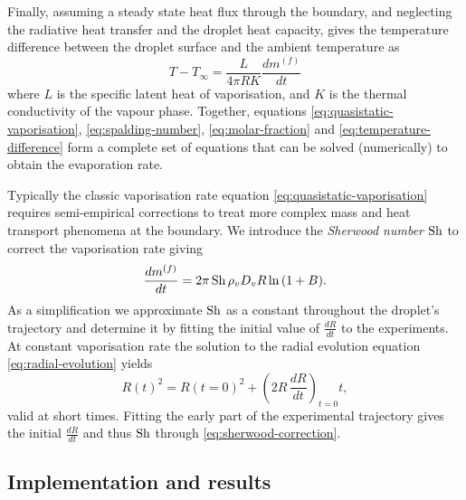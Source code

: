 \documentclass[11pt,twoside]{report}
\begin{document}
Finally, assuming a steady state heat flux through the boundary, and neglecting the radiative heat transfer and the droplet heat capacity, gives the temperature difference between the droplet surface and the ambient temperature as \cite{KulmalaJAS1992,RovelliJPCA2016}
\begin{equation}\label{eq:temperature-difference}
  T - T_\infty = \frac{L}{4\pi R K} \frac{dm^{(f)}}{dt}
\end{equation}
where $L$ is the specific latent heat of vaporisation, and $K$ is the thermal conductivity of the vapour phase.
Together, equations \eqref{eq:quasistatic-vaporisation}, \eqref{eq:spalding-number}, \eqref{eq:molar-fraction} and \eqref{eq:temperature-difference} form a complete set of equations that can be solved (numerically) to obtain the evaporation rate.

Typically the classic vaporisation rate equation \eqref{eq:quasistatic-vaporisation} requires semi-empirical corrections to treat more complex mass and heat transport phenomena at the boundary.
We introduce the \emph{Sherwood number} $\mathrm{Sh}$ to correct the vaporisation rate giving
\begin{equation}\label{eq:sherwood-correction}
  \frac{dm^{(f)}}{dt}
  =
  2\pi \, \mathrm{Sh} \, \rho_v D_v R \ln{(1 + B)}.
\end{equation}
As a simplification we approximate $\mathrm{Sh}$ as a constant throughout the droplet's trajectory and determine it by fitting the initial value of $\tfrac{dR}{dt}$ to the experiments.
At constant vaporisation rate the solution to the radial evolution equation \eqref{eq:radial-evolution} yields
\begin{equation}
  R(t)^2
  =
  R(t=0)^2
  + \left(2R \, \frac{dR}{dt}\right)_{t=0} t,
\end{equation}
valid at short times.
Fitting the early part of the experimental trajectory gives the initial $\tfrac{dR}{dt}$ and thus $\mathrm{Sh}$ through \eqref{eq:sherwood-correction}.

\subsection{Implementation and results}
\end{document}
